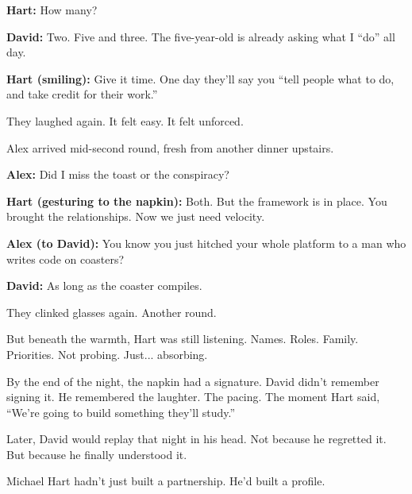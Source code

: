 \textbf{Hart:}  
How many?

\textbf{David:}  
Two. Five and three.  
The five-year-old is already asking what I “do” all day.

\textbf{Hart (smiling):}  
Give it time. One day they’ll say you “tell people what to do, and take credit for their work.”

They laughed again. It felt easy. It felt unforced.

Alex arrived mid-second round, fresh from another dinner upstairs.

\textbf{Alex:}  
Did I miss the toast or the conspiracy?

\textbf{Hart (gesturing to the napkin):}  
Both. But the framework is in place.  
You brought the relationships. Now we just need velocity.

\textbf{Alex (to David):}  
You know you just hitched your whole platform to a man who writes code on coasters?

\textbf{David:}  
As long as the coaster compiles.

They clinked glasses again. Another round.

But beneath the warmth, Hart was still listening.  
Names. Roles. Family. Priorities.  
Not probing. Just... absorbing.

By the end of the night, the napkin had a signature.  
David didn’t remember signing it.  
He remembered the laughter. The pacing. The moment Hart said,  
``We’re going to build something they’ll study.''

Later, David would replay that night in his head.  
Not because he regretted it.  
But because he finally understood it.

Michael Hart hadn’t just built a partnership.  
He’d built a profile.


\medskip

